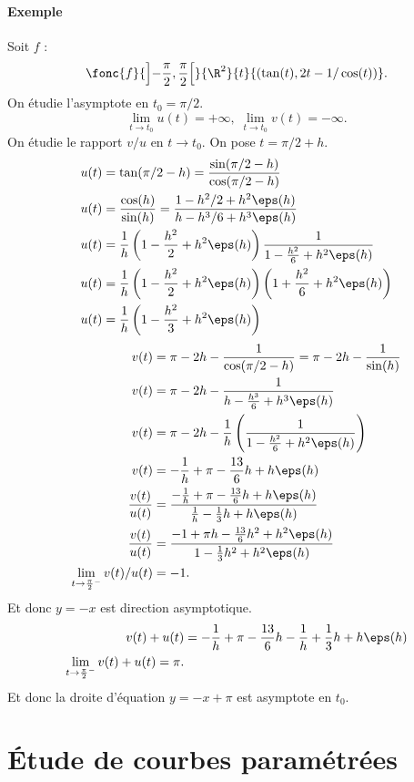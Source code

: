 \paragraph{Exemple}Soit $f$ : \[ \fonc{f}{\left]-\frac{\pi}{2},\frac{\pi}{2}\right[}{\R^{2}}{t}{(\tan(t),2t-1/\cos(t))}.\]On étudie l'asymptote en $t_0 = \pi/2$. \[\lim_{t\to t_0} u(t) = +\infty, \; \lim_{t\to t_0}v(t) = -\infty.\]On étudie le rapport $v/u$ en $t\to t_0$. On pose $t=\pi/2+h$.
\begin{align*}
u(t) &= \tan(\pi/2-h) = \frac{\sin(\pi/2-h)}{\cos(\pi/2-h)}\\
u(t) &= \frac{\cos (h)}{\sin (h)} = \frac{1 -h^{2}/2 + h^{2}\eps(h)}{h-h^{3}/6 + h^{3}\eps(h)}\\
u(t) &= \frac{1}{h}\left(1-\frac{h^{2}}{2}+h^{2}\eps(h)\right)\frac{1}{1-\frac{h^{2}}{6} + h^{2}\eps(h)}\\
u(t) &= \frac{1}{h}\left(1 -\frac{h^{2}}{2} + h^{2}\eps(h) \right)\left( 1+ \frac{h^{2}}{6} + h^{2}\eps(h) \right)\\
u(t) &= \frac{1}{h}\left( 1 - \frac{h^{2}}{3} + h^{2}\eps(h)\right)\\
\end{align*}
\begin{align*}
v(t) &= \pi - 2h - \frac{1}{\cos(\pi/2-h)} = \pi - 2h - \frac{1}{\sin(h)}\\
v(t) &= \pi - 2h - \frac{1}{h-\frac{h^{3}}{6} + h^{3}\eps(h)}\\
v(t) &= \pi - 2h- \frac{1}{h}\left(\frac{1}{1-\frac{h^{2}}{6}+h^{2}\eps(h)}\right)\\
v(t) &=-\frac{1}{h} + \pi-\frac{13}{6}h + h\eps(h) \\
\frac{v(t)}{u(t)} &= \frac{-\frac{1}{h}+\pi-\frac{13}{6}h + h\eps(h)}{\frac{1}{h}-\frac{1}{3}h + h\eps(h)}\\
\frac{v(t)}{u(t)} &= \frac{-1+\pi h -\frac{13}{6}h^{2} + h^{2}\eps(h)}{1-\frac{1}{3}h^{2}+h^{2}\eps(h)}\\
\lim_{t\to \frac{\pi}{2}^{-}} v(t)/u(t) &= -1.
\end{align*}
Et donc $y=-x$ est direction asymptotique.
\begin{align*}
v(t) + u(t) &= -\frac{1}{h} + \pi -\frac{13}{6}h - \frac{1}{h} + \frac{1}{3}h + h\eps(h) \\
\lim_{t\to \frac{\pi}{2}^{-}}v(t)+u(t) = \pi.
\end{align*}
Et donc la droite d'équation $y=-x+\pi$ est asymptote en $t_0$.

\section{\'Etude de courbes paramétrées}

